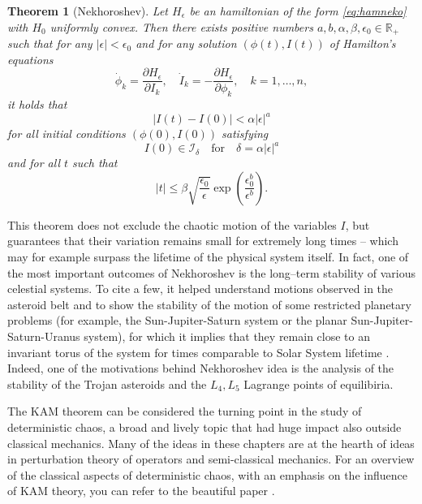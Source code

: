 \documentclass[english,fontsize=11pt,paper=b5]{scrbook}
\numberwithin{equation}{chapter}
\newtheorem{theorem}{Theorem}[chapter]
\theoremstyle{definition}
\begin{document}
      \begin{theorem}[Nekhoroshev]
        Let $H_\epsilon$ be an hamiltonian of the form \eqref{eq:hamneko} with $H_0$ uniformly convex.
        Then there exists positive numbers $a,b,\alpha,\beta,\epsilon_0\in\mathbb{R}_+$ such that for any $|\epsilon|< \epsilon_0$ and for any solution $(\phi(t), I(t))$ of Hamilton's equations
        \begin{equation}
          \dot \phi_k = \frac{\partial H_\epsilon}{\partial I_k}, \quad
          \dot I_k = - \frac{\partial H_\epsilon}{\partial \phi_k}, \quad
          k=1,\ldots,n,
        \end{equation}
        it holds that
        \begin{equation}
          |I(t)-I(0)| < \alpha |\epsilon|^a
        \end{equation}
        for all initial conditions $(\phi(0), I(0))$ satisfying
        \begin{equation}
          I(0) \in \mathcal{I}_\delta\quad\mbox{for}\quad \delta = \alpha|\epsilon|^a
        \end{equation}
        and for all $t$ such that
        \begin{equation}
          |t| \leq \beta \sqrt{\frac{\epsilon_0}\epsilon} \exp\left(\frac{\epsilon^b_0}{\epsilon^b}\right).
        \end{equation}
      \end{theorem}

      This theorem does not exclude the chaotic motion of the variables $I$, but guarantees that their variation remains small for extremely long times -- which may for example surpass the lifetime of the physical system itself.
      In fact, one of the most important outcomes of Nekhoroshev is the long--term stability of various celestial systems. To cite a few, it helped understand motions observed in the asteroid belt and to show the stability of the motion of some restricted planetary problems (for example, the Sun-Jupiter-Saturn system or the planar Sun-Jupiter-Saturn-Uranus system), for which it implies that they remain close to an invariant torus of the system for times comparable to Solar System lifetime \cite{Guzzo2015}.
      Indeed, one of the motivations behind Nekhoroshev idea is the analysis of the stability of the Trojan asteroids and the $L_4, L_5$ Lagrange points of equilibiria.

      The KAM theorem can be considered the turning point in the study of deterministic chaos, a broad and lively topic that had huge impact also outside classical mechanics.
      Many of the ideas in these chapters are at the hearth of ideas in perturbation theory of operators and semi-classical mechanics.
      For an overview of the classical aspects of deterministic chaos, with an emphasis on the influence of KAM theory, you can refer to the beautiful paper \cite{zbMATH05911037}.
\end{document}
